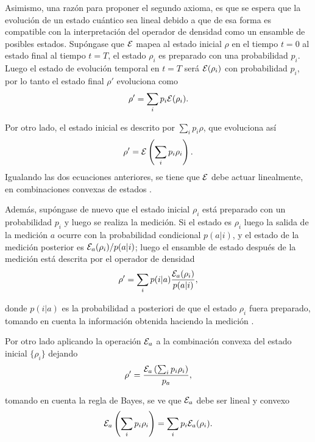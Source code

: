 Asimismo, una razón para proponer el segundo axioma, es que se espera que la evolución de un estado cuántico sea lineal debido a que de esa forma es compatible con la interpretación del operador de densidad como un ensamble de posibles estados. Supóngase que $\mathcal{E}$ mapea al estado inicial $\rho$  en el tiempo $t=0$ al estado final al tiempo $t=T$, el estado $\rho_i$ es preparado con una probabilidad $p_i$. Luego el estado de evolución temporal en $t = T$ será $\mathcal{E}(\rho_i )$ con probabilidad $p_i$, por lo tanto el estado final $\rho'$ evoluciona como \begin{equation}
\rho'= \sum_i p_i \mathcal{E} (\rho_i).
\end{equation}

Por otro lado, el estado inicial es descrito por $\sum_i p_i \rho$, que evoluciona así 
\begin{equation}
    \rho'= \mathcal{E}\left(\sum_i p_i \rho_i\right).
\end{equation} Igualando las dos ecuaciones anteriores, se tiene  que $\mathcal{E}$ debe actuar linealmente, en combinaciones convexas de estados {\cite{preskill2020quantum}}.


Además, supóngase de nuevo que el estado inicial $\rho_i$ está preparado con un probabilidad $p_i$ y luego se realiza la medición. Si el estado es $\rho_i $ luego la salida de la medición  $a$ ocurre con la probabilidad condicional $p(a|i)$, y el estado de la medición  posterior es $\mathcal{E}_a(\rho_i)/p(a|i)$; luego el ensamble de estado después de la medición está descrita por el operador de densidad 
\begin{equation}
    \rho'=\sum_i p(i|a)\dfrac{\mathcal{E}_a(\rho_i)}{p(a|i)},
\end{equation}

donde $p(i|a)$ es la probabilidad a posteriori de que el estado $\rho_i$ fuera preparado, tomando en cuenta la información obtenida haciendo la medición {\cite{preskill2020quantum}}. 

Por otro lado aplicando la operación $\mathcal{E}_a$  a la combinación convexa del estado inicial $\{\rho_i\}$ dejando \begin{equation}
    \rho'=\dfrac{\mathcal{E}_a\left(\sum_i p_i \rho_i\right)}{p_a},
\end{equation}

tomando en cuenta la regla de Bayes, se ve que $\mathcal{E}_a$ debe ser lineal y convexo {\cite{preskill2020quantum}} \begin{equation}
    \mathcal{E}_a\left(\sum_i p_i \rho_i\right)=\sum_i p_i\mathcal{E}_a(\rho_i). 
\end{equation}

